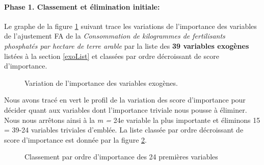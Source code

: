 	\paragraph{Phase 1. Classement et élimination initiale:}
	Le graphe de la figure \ref{fig:eboul} suivant trace les variations de l'importance des variables de l'ajustement FA de la \textit{Consommation de kilogrammes de fertilisants phosphatés par hectare de terre arable} par la liste des \textbf{39 variables exogènes} listées à la section \ref{exoList} et classées par ordre décroissant de score d'importance.
					\begin{figure}[H]
					\centering
					\caption{Variation de l'importance des variables exogènes.}
					\label{fig:eboul}
					\end{figure}
	Nous avons tracé en vert le profil de la variation des score d'importance pour décider quant aux variables dont l'importance triviale nous pousse à éliminer. Nous nous arrêtons ainsi à la \textit{m = }24e variable la plus importante et éliminons 15 = 39-24 variables triviales d'emblée.
	La liste classée par ordre décroissant de score d'importance est donnée par la figure \ref{fig:VARIMP}.
						\begin{figure}[H]
						\centering
						\caption{Classement par ordre d'importance des 24 premières variables}
						\label{fig:VARIMP}
						\end{figure}
